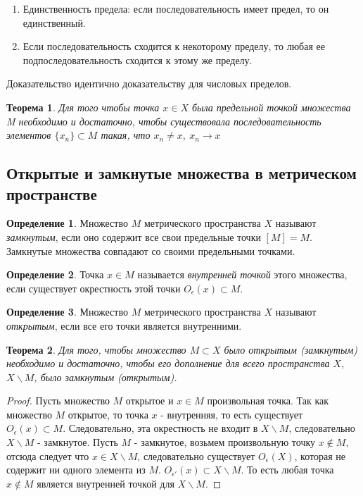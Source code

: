\documentclass[14pt,a4paper]{extarticle}
\newtheorem{theorem}{Теорема}[section]
\theoremstyle{definition}
\newtheorem{definition}{Определение}[section]
\theoremstyle{remark}
\renewcommand{\[}{\begin{dmath*}[compact]}
\renewcommand{\]}{\end{dmath*}}
\newcommand{\be}{\begin{enumerate}}
\newcommand{\ee}{\end{enumerate}}
\newcommand{\sep}{ , \ \allowbreak }
\begin{document}
\be
  \item Единственность предела: если последовательность имеет предел,
  то он единственный.

  \item Если последовательность сходится к некоторому пределу,
  то любая ее подпоследовательность сходится к этому же пределу.
\ee

Доказательство идентично доказательству для числовых пределов.

\begin{theorem}
  Для того чтобы точка $x \in X$ была предельной точкой множества M
  необходимо и достаточно, чтобы существовала последовательность элементов
  $\{x_n\}\subset M$ такая, что $x_n\neq x \sep x_n\to x$
\end{theorem}

\subsection{Открытые и замкнутые множества в метрическом пространстве}

\begin{definition}
  Множество $M$ метрического пространства $X$ называют \textit{замкнутым},
  если оно содержит все свои предельные точки $[M]=M$.
  Замкнутые множества совпадают со своими предельными точками.
\end{definition}

\begin{definition}
  Точка $x \in M$ называется \textit{внутренней точкой} этого множества,
  если существует окрестность этой точки $O_\epsilon(x)\subset M$.
\end{definition}

\begin{definition}
  Множество $M$ метрического пространства $X$ называют \textit{открытым},
  если все его точки является внутренними.
\end{definition}

\begin{theorem}
  Для того, чтобы множество $M \subset X$ было открытым (замкнутым)
  необходимо и достаточно, чтобы его дополнение для всего пространства $X$,
  $X \backslash M$, было замкнутым (открытым).
\end{theorem}

\begin{proof}
  Пусть множество $M$ открытое и $x \in M$ произвольная точка.
  Так как множество $M$ открытое, то точка $x$ - внутренняя, то есть существует
  $O_\epsilon(x)\subset M$. Следовательно, эта окрестность не входит в
  $X \backslash M$, следовательно $X \backslash M$ - замкнутое.
  Пусть $M$ - замкнутое, возьмем произвольную точку $x \notin M$, отсюда следует
  что $x\in X\backslash M$, следовательно существует $O_{\epsilon}(X)$, которая
  не содержит ни одного элемента из $M$.
  $O_{\epsilon'}(x)\subset X\backslash M$.
  То есть любая точка $x \notin M$ является внутренней точкой для
  $X \backslash M$.
\end{proof}
\end{document}
